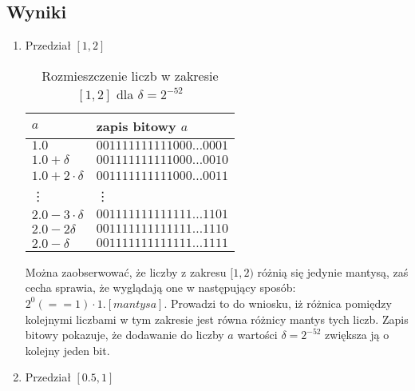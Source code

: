 \documentclass{classrep}
\begin{document}
	\subsection{Wyniki}
		\begin{enumerate}
			\item Przedział $[1,2]$
			
			\begin{table}[!h]
        		\centering
            	\begin{tabular}{ll} \toprule
                	$a$ & {zapis bitowy $a$} \\ \midrule
                	$1.0$ & $001111111111000\dots0001$ \\ 
 					$1.0+\delta$ & $001111111111000\dots0010$ \\
 					$1.0+2\cdot\delta$ & $001111111111000\dots0011$ \\
 					\vdots & \vdots \\
 					$2.0-3
 				\cdot\delta$ & $001111111111111\dots1101$ \\
 					$2.0-2\delta$ & $001111111111111\dots1110$ \\
 					$2.0-\delta$ & $001111111111111\dots1111$ \\\bottomrule
            	\end{tabular}
            	\caption{Rozmieszczenie liczb w zakresie $[1,2]$ dla $\delta = 2^{-52}$}
				\label{table:5}
   			\end{table}
   			Można zaobserwować, że liczby z zakresu $[1,2)$ różnią się jedynie mantysą, zaś cecha sprawia, że wyglądają one w następujący sposób:
   			$2^{0} (==1) \cdot 1.[mantysa]$. Prowadzi to do wniosku, iż różnica pomiędzy kolejnymi liczbami w tym zakresie jest równa różnicy mantys tych
   			liczb. 
   			Zapis bitowy pokazuje, że dodawanie do liczby $a$ wartości $\delta = 2^{-52}$ zwiększa ją o 
			kolejny jeden bit. 
			\newline
			
			\item Przedział $[0.5,1]$
			

\end{enumerate}
\end{document}
